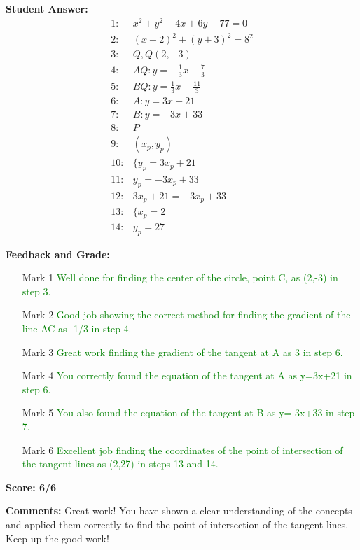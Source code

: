 \documentclass{article}
\begin{document}
\textbf{Student Answer:}
\begin{align*}
1: & x^2+y^2-4x+6y-77=0 \\
2: & (x-2)^2+(y+3)^2=8^2 \\
3: & Q,Q(2,-3) \\
4: & AQ:y=-\frac{1}{3}x-\frac{7}{3} \\
5: & BQ:y=\frac{1}{3}x-\frac{11}{3} \\
6: & A:y=3x+21 \\
7: & B:y=-3x+33 \\
8: & P \\
9: & (x_p,y_p) \\
10: & \{y_p=3x_p+21 \\
11: & y_p=-3x_p+33 \\
12: & 3x_p+21=-3x_p+33 \\
13: & \{x_p=2 \\
14: & y_p=27
\end{align*}

\textbf{Feedback and Grade:}
\begin{itemize}
\item[Mark 1] \textcolor{green}{Well done for finding the center of the circle, point C, as (2,-3) in step 3.}
\item[Mark 2] \textcolor{green}{Good job showing the correct method for finding the gradient of the line AC as -1/3 in step 4.}
\item[Mark 3] \textcolor{green}{Great work finding the gradient of the tangent at A as 3 in step 6.}
\item[Mark 4] \textcolor{green}{You correctly found the equation of the tangent at A as y=3x+21 in step 6.}
\item[Mark 5] \textcolor{green}{You also found the equation of the tangent at B as y=-3x+33 in step 7.}
\item[Mark 6] \textcolor{green}{Excellent job finding the coordinates of the point of intersection of the tangent lines as (2,27) in steps 13 and 14.}
\end{itemize}

\textbf{Score: 6/6}

\textbf{Comments:} Great work! You have shown a clear understanding of the concepts and applied them correctly to find the point of intersection of the tangent lines. Keep up the good work!
\end{document}
